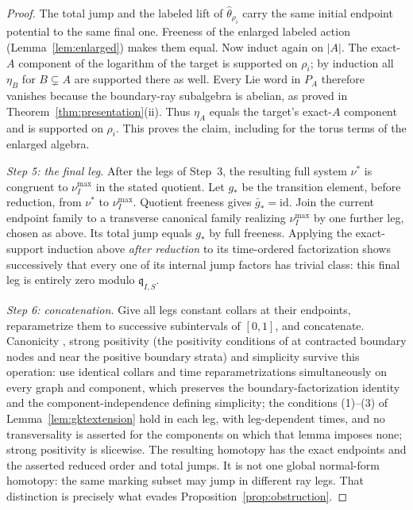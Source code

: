 \documentclass[11pt]{amsart}
\theoremstyle{definition}
\theoremstyle{remark}
\begin{document}
\begin{proof}
The total jump and the labeled lift of $\widehat\theta_{\rho_i}$ carry the same initial
endpoint potential to the same final one. Freeness of the enlarged labeled
action (Lemma~\ref{lem:enlarged}) makes them equal. Now induct again on
$\lvert A\rvert$. The exact-$A$ component of the logarithm of the target is
supported on $\rho_i$; by induction all $\eta_B$ for $B\subsetneq A$ are supported
there as well. Every Lie word in $P_A$ therefore vanishes because the
boundary-ray subalgebra is abelian, as proved in
Theorem~\ref{thm:presentation}(ii). Thus $\eta_A$ equals the target's exact-$A$
component and is supported on $\rho_i$. This proves the claim, including for
the torus terms of the enlarged algebra.

\emph{Step 5: the final leg.}
After the legs of Step~3, the resulting full system $\nu^*$ is congruent to
$\nu_I^{\max}$ in the stated quotient. Let $g_{*}$ be the transition element, before
reduction, from $\nu^*$ to $\nu_I^{\max}$. Quotient freeness gives $\bar g_{*}=\mathrm{id}$. Join
the current endpoint family to a transverse canonical family realizing $\nu_I^{\max}$ by
one further leg, chosen as above. Its total jump equals $g_{*}$ by full
freeness. Applying the exact-support induction above \emph{after reduction} to
its time-ordered factorization shows successively that every one of its
internal jump factors has trivial class: this final leg is entirely
zero modulo $\mathfrak q_{I,S}$.

\emph{Step 6: concatenation.}
Give all legs constant collars at their endpoints, reparametrize them to
successive subintervals of $[0,1]$, and concatenate. Canonicity
\cite[Def.~3.22]{GKT}, strong positivity (the positivity conditions of
\cite[Def.~3.18]{GKT} at contracted boundary nodes and near the positive
boundary strata) and simplicity \cite[Defs.~3.36--3.37]{GKT} survive
this operation: use identical collars and
time reparametrizations simultaneously on every graph and component, which
preserves the boundary-factorization identity \cite[(3.12)]{GKT} and the
component-independence defining simplicity; the conditions (1)--(3) of
Lemma~\ref{lem:gktextension} hold in each leg, with leg-dependent times, and
no transversality is asserted for the components on which that lemma imposes
none; strong positivity is slicewise.
The resulting homotopy has the exact endpoints and the asserted reduced order
and total jumps. It is not one global normal-form homotopy: the same
marking subset may jump in different ray legs. That distinction is precisely
what evades Proposition~\ref{prop:obstruction}.

\end{proof}
\end{document}

